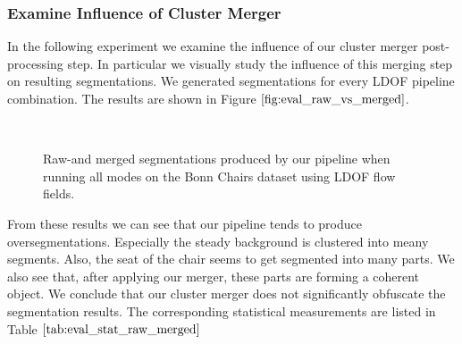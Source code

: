 \subsubsection{Examine Influence of Cluster Merger}
In the following experiment we examine the influence of our cluster merger post-processing step. In particular we visually study the influence of this merging step on resulting segmentations. We generated segmentations for every LDOF pipeline combination. The results are shown in Figure $\ref{fig:eval_raw_vs_merged}$.
\begin{figure}[H]
\begin{center}
~
~
\end{center}
\caption[Bonn Chairs Segmentations Frame 30]{Raw-and merged segmentations produced by our pipeline when running all modes on the Bonn Chairs dataset using LDOF flow fields.}
\label{fig:eval_raw_vs_merged}
\end{figure}
From these results we can see that our pipeline tends to produce oversegmentations. Especially the steady background is clustered into meany segments. Also, the seat of the chair seems to get segmented into many parts. We also see that, after applying our merger, these parts are forming a coherent object. We conclude that our cluster merger does not significantly obfuscate the segmentation results. The corresponding statistical measurements are listed in Table $\ref{tab:eval_stat_raw_merged}$

